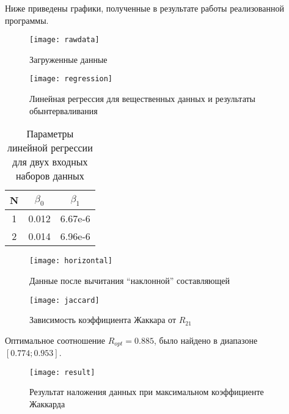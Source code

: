 Ниже приведены графики, полученные в результате работы реализованной программы.

\begin{figure}[H]
	\begin{center}
		\texttt{[image: rawdata]}
		\label{pic:rawdata}
		\caption{Загруженные данные}
	\end{center}
\end{figure}

\begin{figure}[H]
	\begin{center}
		\texttt{[image: regression]}
		\label{pic:regression}
		\caption{Линейная регрессия для вещественных данных и результаты обынтерваливания}
	\end{center}
\end{figure}

\begin{table}[H]
	\begin{center}
		\begin{tabular}{|c|c|c|}
			\hline
			N & $\beta_0$ & $\beta_1$ \\
			\hline
			1 & 0.012 & 6.67e-6 \\
			\hline
			2 & 0.014 & 6.96e-6 \\
			\hline
		\end{tabular}
		\caption{Параметры линейной регрессии для двух входных наборов данных}
	\end{center}
\end{table}

\begin{figure}[H]
	\begin{center}
		\texttt{[image: horizontal]}
		\label{pic:horizontal}
		\caption{Данные после вычитания ``наклонной'' составляющей}
	\end{center}
\end{figure}

\begin{figure}[H]
	\begin{center}
		\texttt{[image: jaccard]}
		\label{pic:jaccard}
		\caption{Зависимость коэффициента Жаккара от $R_{21}$}
	\end{center}
\end{figure}

Оптимальное соотношение $R_{opt} = 0.885$, было найдено в диапазоне $[0.774; 0.953]$.

\begin{figure}[H]
	\begin{center}
		\texttt{[image: result]}
		\label{pic:result}
		\caption{Результат наложения данных при максимальном коэффициенте Жаккарда}
	\end{center}
\end{figure}
